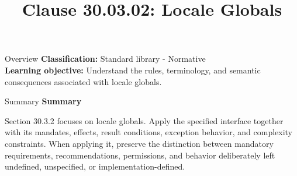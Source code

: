 \documentclass[10pt,letterpaper]{article}
\title{Clause 30.03.02: Locale Globals}
\author{}
\date{}
\begin{document}
\maketitle
\begin{CornellOverviewBox}{Overview}
\textbf{Classification:} Standard library - Normative\\[2pt]
\textbf{Learning objective:} Understand the rules, terminology, and semantic consequences associated with locale globals.
\end{CornellOverviewBox}\begin{CornellSummaryBox}{Summary}
{\sffamily\bfseries\color{Accent} Summary}\par\vspace{3pt}Section 30.3.2 focuses on locale globals. Apply the specified interface together with its mandates, effects, result conditions, exception behavior, and complexity constraints. When applying it, preserve the distinction between mandatory requirements, recommendations, permissions, and behavior deliberately left undefined, unspecified, or implementation-defined.
\end{CornellSummaryBox}
\end{document}
